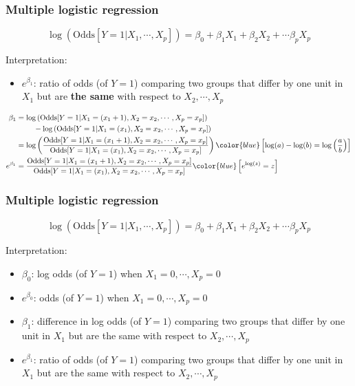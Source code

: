 \documentclass[12pt, 
hyperref={colorlinks=true, linkcolor=blue, urlcolor=cyan}]{beamer}
\begin{document}
\begin{frame}
\frametitle{Multiple logistic regression}
$$\log\left(\text{Odds}[Y =1 |X_1,\cdots,X_p]\right) = \beta_0 + \beta_1 X_1 + \beta_2X_2 + \cdots \beta_p X_p$$

\color{blue} Interpretation: \color{black}
\begin{itemize} \color{orange}
\item $e^{\beta_1}$:  \pause ratio of odds (of $Y=1$) comparing two groups that differ by one unit in $X_1$ but are \textbf{the same} with respect to $X_2,\cdots,X_p$  \pause 
\end{itemize}
\vspace{-0.3cm}
\begin{scriptsize}
\begin{align*}
\beta_1 & = \log\left(\text{Odds}[Y =1 |X_1=(x_1+1),X_2=x_2,\cdots,X_p=x_p]\right) \\
& \ \ \ \ \ \ \  - \log\left(\text{Odds}[Y =1 |X_1=(x_1),X_2=x_2,\cdots,X_p=x_p]\right) \\
& = \log\left(\frac{\text{Odds}[Y =1 |X_1=(x_1+1),X_2=x_2,\cdots,X_p=x_p]}{\text{Odds}[Y =1 |X_1=(x_1),X_2=x_2,\cdots,X_p=x_p]} \right) \color{blue} \left[ \log(a)-\log(b) = \log\left(\frac{a}{b}\right)\right] \\
e^{\beta_1} & = \frac{\text{Odds}[Y =1 |X_1=(x_1+1),X_2=x_2,\cdots,X_p=x_p]}{\text{Odds}[Y =1 |X_1=(x_1),X_2=x_2,\cdots,X_p=x_p]} \color{blue} \left[e^{\log(z)} = z\right]
\end{align*}
\end{scriptsize}

\end{frame}

\begin{frame}
\frametitle{Multiple logistic regression}
$$\log\left(\text{Odds}[Y =1 |X_1,\cdots,X_p]\right) = \beta_0 + \beta_1 X_1 + \beta_2X_2 + \cdots \beta_p X_p$$

\color{blue} Interpretation: \color{black}
\begin{itemize}
\item $\beta_0$:  log odds (of $Y=1$) when $X_1 = 0, \cdots, X_p = 0$
\item \color{orange} $e^{\beta_0}$: \pause odds (of $Y=1$) when $X_1 = 0, \cdots, X_p = 0$ \color{black} \pause
\item $\beta_1$: difference in log odds (of $Y=1$) comparing two groups that differ by one unit in $X_1$ but are the same with respect to $X_2,\cdots,X_p$ \pause
\item \color{orange} $e^{\beta_1}$: \pause ratio of odds (of $Y=1$) comparing two groups that differ by one unit in $X_1$ but are the same with respect to $X_2,\cdots,X_p$ \color{black}
\end{itemize}

\end{frame}
\end{document}
